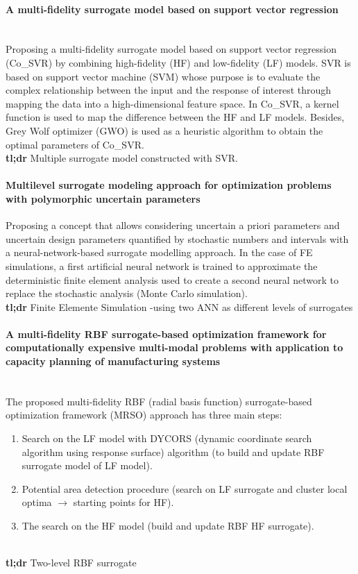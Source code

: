 \documentclass[preprint,12pt]{elsarticle}
\begin{document}
\paragraph{A multi-fidelity surrogate model based on support vector regression}
\cite{shi2020multi}\\
Proposing a multi-fidelity surrogate model based on support vector regression (Co\_SVR) by combining high-fidelity (HF) and low-fidelity (LF) models. SVR is based on support vector machine (SVM) whose purpose is to evaluate the complex relationship between the input and the response of interest through mapping the data into a high-dimensional feature space. In Co\_SVR, a kernel function is used to map the difference between the HF and LF models. Besides, Grey Wolf optimizer (GWO) is used as a heuristic algorithm to obtain the optimal parameters of Co\_SVR.
\\
\textbf{tl;dr} Multiple surrogate model constructed with SVR.

\paragraph{Multilevel surrogate modeling approach for optimization problems with polymorphic uncertain parameters}
\cite{freitag2020multilevel} 
Proposing a concept that allows considering uncertain a priori parameters and uncertain design parameters quantified by stochastic numbers and intervals with a neural-network-based surrogate modelling approach. In the case of FE simulations, a first artificial neural network is trained to approximate the deterministic finite element analysis used to create a second neural network to replace the stochastic analysis (Monte Carlo simulation). 
\\ \textbf{tl;dr} Finite Elemente Simulation -using two ANN as different levels of surrogates

\paragraph{A multi-fidelity RBF surrogate-based optimization framework for computationally expensive multi-modal problems with application to capacity planning of manufacturing systems}
\cite{yi2020multi} \\
The proposed multi-fidelity RBF (radial basis function) surrogate-based optimization framework (MRSO) approach has three main steps:
\begin{enumerate}
    \item Search on the LF model with DYCORS (dynamic coordinate search algorithm using response surface) algorithm (to build and update RBF surrogate model of LF model).
    \item Potential area detection procedure (search on LF surrogate and cluster local optima $\rightarrow$ starting points for HF).
    \item The search on the HF model (build and update RBF HF surrogate).
\end{enumerate}
\\ \textbf{tl;dr} Two-level RBF surrogate  
\end{document}
